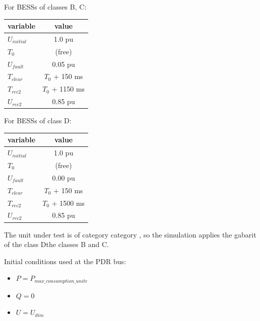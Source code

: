     For BESSs of classes B, C:
    \begin{center}
        \begin{tabular}{lc}
            \toprule
            \textbf{variable} & \textbf{value} \\
            \midrule
            $U_{initial}$     & 1.0 pu                   \\
            $T_{0}$           & (free)                   \\
            $U_{fault}$       & 0.05 pu                  \\
            $T_{clear}$       & $T_{0}$ + 150 ms         \\
            $T_{rec2}$        & $T_{0}$ + 1150 ms        \\
            $U_{rec2}$        & 0.85 pu                  \\
            \bottomrule
        \end{tabular}
    \end{center}

    For BESSs of class D:
    \begin{center}
        \begin{tabular}{lc}
            \toprule
            \textbf{variable} & \textbf{value} \\
            \midrule
            $U_{initial}$     & 1.0 pu                   \\
            $T_{0}$           & (free)                   \\
            $U_{fault}$       & 0.00 pu                  \\
            $T_{clear}$       & $T_{0}$ + 150 ms         \\
            $T_{rec2 }$       & $T_{0}$ + 1500 ms        \\
            $U_{rec2}$        & 0.85 pu                  \\
            \bottomrule
        \end{tabular}
    \end{center}

    \noindent The unit under test is of category {{ category }}, so the simulation
    applies the gabarit of the class Dthe classes B and C.

    \begin{description}
        \item Initial conditions used at the PDR bus:
        \begin{itemize}
            \item $P = P_{max\_consumption\_unite}$
            \item $Q = 0$
            \item $U = U_{dim}$
        \end{itemize}
    \end{description}

